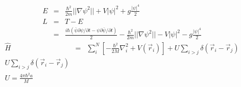 \documentclass[12pt,a4paper]{jbook}
\begin{document}
\begin{eqnarray}
E & = & \frac{\hbar^2}{2m} ||\nabla \psi^2|| + V |\psi|^2 + g \frac{|\psi|^4}{2}
\\
L & = & T - E
\\
& = & \frac{i \hbar (\bar{\psi}\partial \psi/\partial t - \psi \partial \bar{\psi} / \partial t)}{2}
- \frac{\hbar^2}{2m} ||\nabla \psi^2|| - V |\psi|^2 - g \frac{|\psi|^4}{2}
\end{eqnarray}
\begin{eqnarray}
\hat{H} & = & \sum_i^N \left[ - \frac{\hbar^2}{2M} \nabla_i^2 + V (\vec{r}_i) \right] + U \sum_{i>j}
\delta(\vec{r}_i - \vec{r}_j)
\\
U \sum_{i>j} \delta(\vec{r}_i - \vec{r}_j)
\\
U = \frac{4 \pi \hbar^2 a}{M}
\end{eqnarray}
\fi
\end{document}
